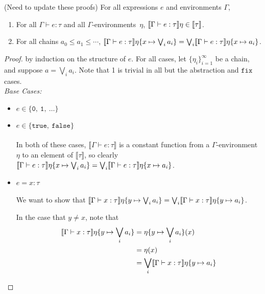 %
\begin{thm} 
(Need to update these proofs)
For all expressions $e$ and environments $\Gamma$,
\begin{enumerate}
\item For all $\Gamma\vdash e : \tau$ and all $\Gamma$-environments~$\eta$,
$\llbracket{{\Gamma}\vdash{e}:{\tau}}\rrbracket{\eta}\in\llbracket{\tau}\rrbracket$.
\item For all chains $a_0\leq a_1\leq\dotsb$,
$\llbracket{{\Gamma}\vdash{e}:{\tau}}\rrbracket{\eta\{{x}\mapsto{\bigvee_i a_i}\}} =
\bigvee_i\llbracket{{\Gamma}\vdash{e}:{\tau}}\rrbracket{\eta\{{x}\mapsto{a_i}\}}$.
\end{enumerate}
\end{thm}
\begin{proof}
by induction on the structure of $e$. For all cases, let $\{ \eta_i \}^{\infty}_{i=1}$ be a chain, and suppose $ a = \bigvee_i a_i$. 
Note that 1 is trivial in all but the abstraction and $\texttt{fix}$ cases.\\
 \emph{Base Cases: } 
 \begin{itemize}
 \item $e \in \{ \texttt{0}, \ \texttt{1}, \ \ldots \}$
 \item $e \in \{ \texttt{true}, \ \texttt{false} \}$\\ \\
  In both of these cases, $\llbracket \Gamma \vdash e : \tau \rrbracket$ is a constant function from a $\Gamma$-environment
 $\eta$ to an element of $\llbracket \tau \rrbracket$, so clearly $\llbracket{{\Gamma}\vdash{e}:{\tau}}\rrbracket{\eta\{{x}\mapsto{\bigvee_i a_i}\}} =
\bigvee_i\llbracket{{\Gamma}\vdash{e}:{\tau}}\rrbracket{\eta\{{x}\mapsto{a_i}\}}$.

 \item $e = x : \tau$ \\ \\
 We want to show that $\llbracket{{\Gamma}\vdash{x}:{\tau}}\rrbracket{\eta\{{y}\mapsto{\bigvee_i a_i}\}} =
\bigvee_i\llbracket{{\Gamma}\vdash{x}:{\tau}}\rrbracket{\eta\{{y}\mapsto{a_i}\}}$.

In the case that $ y \neq x$, note that
\begin{align*}
\llbracket{{\Gamma}\vdash{x}:{\tau}}\rrbracket{\eta\{{y}\mapsto{\bigvee_i a_i}\}} &= \eta\{y\mapsto \bigvee_i a_i\}(x) \\
&= \eta (x) \\
&= \bigvee_i\llbracket{{\Gamma}\vdash{x}:{\tau}}\rrbracket{\eta\{{y}\mapsto{a_i}\}}
\end{align*}


\end{itemize}
\end{proof}
